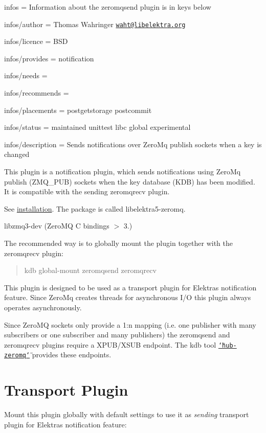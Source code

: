 
\begin{DoxyItemize}
\item infos = Information about the zeromqsend plugin is in keys below
\item infos/author = Thomas Wahringer \href{mailto:waht@libelektra.org}{\tt waht@libelektra.\+org}
\item infos/licence = B\+SD
\item infos/provides = notification
\item infos/needs =
\item infos/recommends =
\item infos/placements = postgetstorage postcommit
\item infos/status = maintained unittest libc global experimental
\item infos/description = Sends notifications over Zero\+Mq publish sockets when a key is changed
\end{DoxyItemize}

This plugin is a notification plugin, which sends notifications using Zero\+Mq publish ({\ttfamily Z\+M\+Q\+\_\+\+P\+UB}) sockets when the key database (K\+DB) has been modified. It is compatible with the sending zeromqrecv plugin.

See \hyperlink{doc_INSTALL_md}{installation}. The package is called {\ttfamily libelektra5-\/zeromq}.


\begin{DoxyItemize}
\item {\ttfamily libzmq3-\/dev} (Zero\+MQ C bindings $>$ 3.)
\end{DoxyItemize}

The recommended way is to globally mount the plugin together with the zeromqrecv plugin\+:

\begin{quote}
kdb global-\/mount zeromqsend zeromqrecv \end{quote}


This plugin is designed to be used as a transport plugin for Elektra\textquotesingle{}s notification feature. Since Zero\+Mq creates threads for asynchronous I/O this plugin always operates asynchronously.

Since Zero\+MQ sockets only provide a 1\+:n mapping (i.\+e. one publisher with many subscribers or one subscriber and many publishers) the {\ttfamily zeromqsend} and {\ttfamily zeromqrecv} plugins require a X\+P\+U\+B/\+X\+S\+UB endpoint. The kdb tool \href{https://www.libelektra.org/tools/hub-zeromq}{\tt \char`\"{}hub-\/zeromq\char`\"{}} provides these endpoints.\hypertarget{autotoc_md906_autotoc_md910}{}\section{Transport Plugin}\label{autotoc_md906_autotoc_md910}
Mount this plugin globally with default settings to use it as {\itshape sending} transport plugin for Elektra\textquotesingle{}s notification feature\+:

